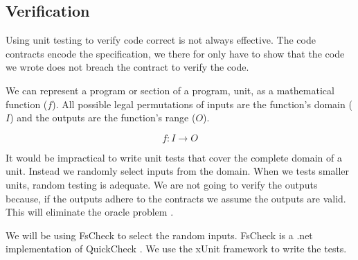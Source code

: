 \subsection{Verification}

Using unit testing to verify code correct is not always effective. The code contracts 
encode the specification, we there for only have to show that the code we wrote 
does not breach the contract to verify the code.

We can represent a program or section of a program, unit, as a mathematical function
(\(f\)). All possible legal permutations of inputs are the function's domain (\(I\)) and 
the outputs are the function's range (\(O\)).

\[ f: I \rightarrow O \]

It would be impractical to write unit tests that cover the complete domain
of a unit. Instead we randomly select inputs from the domain. When we tests smaller
units, random testing is adequate. We are not going to verify the outputs because,
if the outputs adhere to the contracts we assume the outputs are valid. This will 
eliminate the oracle problem \parencite{QuickCheck}\parencite{Hamlet94randomtesting}.

We will be using FsCheck to select the random inputs. FsCheck is a .net implementation
of QuickCheck \parencite{FsCheck_home}. We use the xUnit framework to write the tests.



